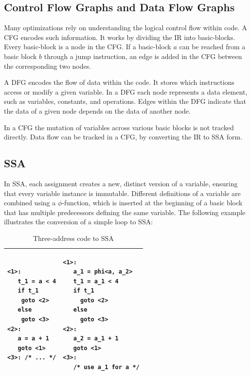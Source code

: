 \subsection{Control Flow Graphs and Data Flow Graphs}

Many optimizations rely on understanding the logical control flow within code. A \acf{CFG} encodes such information. It works by dividing the \ac{IR} into basic-blocks. Every basic-block is a node in the \ac{CFG}. If a basic-block $a$ can be reached from a basic block $b$ through a jump instruction, an edge is added in the \ac{CFG} between the corresponding two nodes\cite{chong-cfg}.

A \acf{DFG} encodes the flow of data within the code. It stores which instructions access or modify a given variable. In a \ac{DFG} each node represents a data element, such as variables, constants, and operations. Edges within the \ac{DFG} indicate that the data of a given node depends on the data of another node\cite{gibbons-dfg}.

In a \ac{CFG} the mutation of variables across various basic blocks is not tracked directly. Data flow can be tracked in a \ac{CFG}, by converting the \ac{IR} to \ac{SSA} form.

\subsection{\acf{SSA}}

In \ac{SSA}, each assignment creates a new, distinct version of a variable, ensuring that every variable instance is immutable. Different definitions of a variable are combined using a $\phi$-function, which is inserted at the beginning of a basic block that has multiple predecessors defining the same variable\cite{dragon-book}. The following example illustrates the conversion of a simple loop to \ac{SSA}:

\begin{table}[h]
	\centering
    \caption{Three-address code to \ac{SSA}}
	\renewcommand{\arraystretch}{1.2}
	\begin{tabular}{ |p{7cm}|p{7cm}| }
		\hline
        \begin{minipage}[t]{7cm}
        \begin{lstlisting}
<1>:
   t_1 = a < 4
   if t_1
    goto <2>
   else
    goto <3>
<2>:
   a = a + 1
   goto <1>
<3>: /* ... */
        \end{lstlisting}
        \end{minipage}
        &
        \begin{minipage}[t]{7cm}
        \begin{lstlisting}
<1>: 
   a_1 = phi<a, a_2>
   t_1 = a_1 < 4
   if t_1
     goto <2>
   else
     goto <3>
<2>:
   a_2 = a_1 + 1
   goto <1>
<3>:
   /* use a_1 for a */
        \end{lstlisting}
        \end{minipage}
	\\
        \hline
	\end{tabular}
\end{table}

